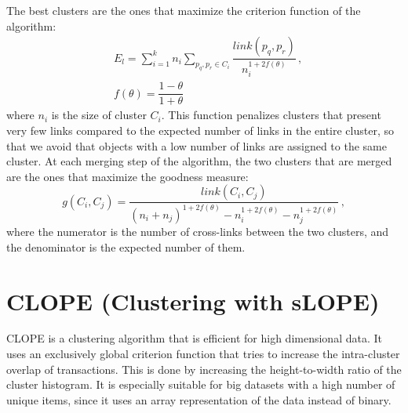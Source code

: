 The best clusters are the ones that maximize the criterion function of the algorithm:
\begin{align*}
    &E_l = \sum_{i=1}^k n_i \sum_{p_q,p_r \in C_i} \dfrac{link(p_q, p_r)}{n_i^{1 + 2 f(\theta)}} \,, \\
    & f(\theta) = \dfrac{1-\theta}{1+\theta}
\end{align*}
where $n_i$ is the size of cluster $C_i$. This function penalizes clusters that present very few links compared to the expected number of links in the entire cluster, so that we avoid that objects with a low number of links are assigned to the same cluster. At each merging step of the algorithm, the two clusters that are merged are the ones that maximize the goodness measure:
\begin{equation*}
    g(C_i, C_j) = \dfrac{link(C_i, C_j)}{(n_i + n_j)^{1+2f(\theta)} - n_i^{1+2f(\theta)} - n_j^{1+2f(\theta)}} \,,
\end{equation*}
where the numerator is the number of cross-links between the two clusters, and the denominator is the expected number of them.

\section{CLOPE (Clustering with sLOPE)}

CLOPE is a clustering algorithm that is efficient for high dimensional data. It uses an exclusively global criterion function that tries to increase the intra-cluster overlap of transactions. This is done by increasing the height-to-width ratio of the cluster histogram. It is especially suitable for big datasets with a high number of unique items, since it uses an array representation of the data instead of binary.

